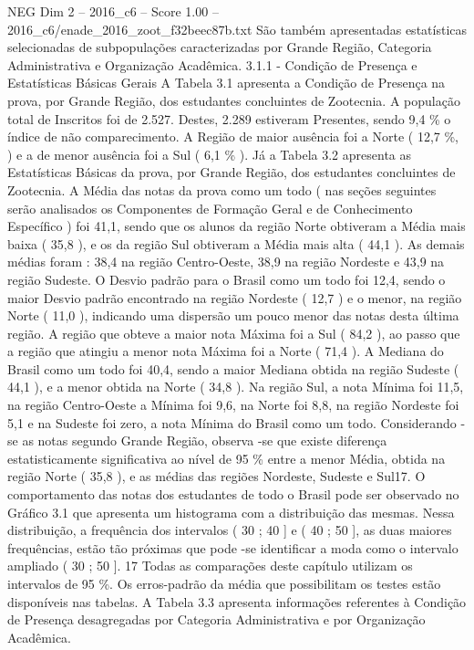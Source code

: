\begin{textsample}{NEG Dim 2 – 2016\_c6 – Score 1.00 – 2016\_c6/enade\_2016\_zoot\_f32beec87b.txt}
São também apresentadas estatísticas selecionadas de subpopulações caracterizadas por Grande Região, Categoria Administrativa e Organização Acadêmica. 3.1.1 - Condição de Presença e Estatísticas Básicas Gerais A Tabela 3.1 apresenta a Condição de Presença na prova, por Grande Região, dos estudantes concluintes de Zootecnia.
A população total de Inscritos foi de 2.527.
Destes, 2.289 estiveram Presentes, sendo 9,4 \% o índice de não comparecimento.
A Região de maior ausência foi a Norte ( 12,7 \%, ) e a de menor ausência foi a Sul ( 6,1 \% ).
Já a Tabela 3.2 apresenta as Estatísticas Básicas da prova, por Grande Região, dos estudantes concluintes de Zootecnia.
A Média das notas da prova como um todo ( nas seções seguintes serão analisados os Componentes de Formação Geral e de Conhecimento Específico ) foi 41,1, sendo que os alunos da região Norte obtiveram a Média mais baixa ( 35,8 ), e os da região Sul obtiveram a Média mais alta ( 44,1 ).
As demais médias foram : 38,4 na região Centro-Oeste, 38,9 na região Nordeste e 43,9 na região Sudeste.
O Desvio padrão para o Brasil como um todo foi 12,4, sendo o maior Desvio padrão encontrado na região Nordeste ( 12,7 ) e o menor, na região Norte ( 11,0 ), indicando uma dispersão um pouco menor das notas desta última região.
A região que obteve a maior nota Máxima foi a Sul ( 84,2 ), ao passo que a região que atingiu a menor nota Máxima foi a Norte ( 71,4 ).
A Mediana do Brasil como um todo foi 40,4, sendo a maior Mediana obtida na região Sudeste ( 44,1 ), e a menor obtida na Norte ( 34,8 ).
Na região Sul, a nota Mínima foi 11,5, na região Centro-Oeste a Mínima foi 9,6, na Norte foi 8,8, na região Nordeste foi 5,1 e na Sudeste foi zero, a nota Mínima do Brasil como um todo.
Considerando -se as notas segundo Grande Região, observa -se que existe diferença estatisticamente significativa ao nível de 95 \% entre a menor Média, obtida na região Norte ( 35,8 ), e as médias das regiões Nordeste, Sudeste e Sul17.
O comportamento das notas dos estudantes de todo o Brasil pode ser observado no Gráfico 3.1 que apresenta um histograma com a distribuição das mesmas.
Nessa distribuição, a frequência dos intervalos ( 30 ; 40 ] e ( 40 ; 50 ], as duas maiores frequências, estão tão próximas que pode -se identificar a moda como o intervalo ampliado ( 30 ; 50 ]. 17 Todas as comparações deste capítulo utilizam os intervalos de 95 \%.
Os erros-padrão da média que possibilitam os testes estão disponíveis nas tabelas.
A Tabela 3.3 apresenta informações referentes à Condição de Presença desagregadas por Categoria Administrativa e por Organização Acadêmica.

\end{textsample}
